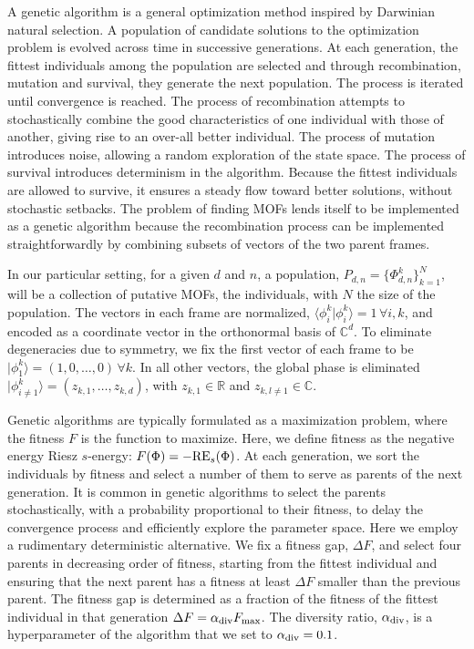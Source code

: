 \documentclass[%
superscriptaddress,
amsmath,amssymb,
 aps,
pra,
floatfix,
]{revtex4-2}
\begin{document}
A genetic algorithm is a general optimization method inspired by Darwinian natural selection. A population of candidate solutions to the optimization problem is evolved across time in successive generations. At each generation, the fittest individuals among the population are selected and through recombination, mutation and survival, they generate the next population. The process is iterated until convergence is reached. The process of recombination attempts to stochastically combine the good characteristics of one individual with those of another, giving rise to an over-all better individual. The process of mutation introduces noise, allowing a random exploration of the state space. The process of survival introduces determinism in the algorithm. Because the fittest individuals are allowed to survive, it ensures a steady flow toward better solutions, without stochastic setbacks.
The problem of finding MOFs lends itself to be implemented as a genetic algorithm because the recombination process can be implemented straightforwardly by combining subsets of vectors of the two parent frames. 

In our particular setting, for a given $d$ and $n$, a population, $P_{d, n} = \{\Phi_{d, n}^k\}_{k=1}^N$, will be a collection of putative MOFs, the individuals, with $N$ the size of the population. The vectors in each frame are normalized, $\langle \phi_i^k | \phi_i^k\rangle = 1 \, \forall i, k$, and encoded as a coordinate vector in the orthonormal basis of $\mathbb C^d$. To eliminate degeneracies due to symmetry, we fix the first vector of each frame to be $|\phi_1^k\rangle = (1, 0, \ldots, 0) \, \forall k$. In all other vectors, the global phase is eliminated $|\phi_{i\neq1}^k\rangle = (z_{k, 1}, \ldots, z_{k, d})$, with $z_{k, 1} \in \mathbb R$ and $z_{k, l \neq1} \in \mathbb C$.

Genetic algorithms are typically formulated as a maximization problem, where the fitness $F$ is the function to maximize. Here, we define fitness as the negative energy Riesz $s$-energy: $F(\Phi) = -{\rm RE}_s(\Phi)$. At each generation, we sort the individuals by fitness and select a number of them to serve as parents of the next generation. It is common in genetic algorithms to select the parents stochastically, with a probability proportional to their fitness, to delay the convergence process and efficiently explore the parameter space. Here we employ a rudimentary deterministic alternative. We fix a fitness gap, $\Delta F$, and select four parents in decreasing order of fitness, starting from the fittest individual and ensuring that the next parent has a fitness at least $\Delta F$ smaller than the previous parent. The fitness gap is determined as a fraction of the fitness of the fittest individual in that generation $\Delta F = \alpha_{\rm div} F_{\rm max}$. The diversity ratio, $\alpha_{\rm div}$, is a hyperparameter of the algorithm that we set to $\alpha_{\rm div} = 0.1$.
\end{document}
